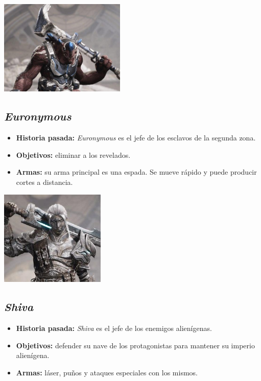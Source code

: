 \documentclass[twoside]{article}
\begin{document}
\begin{center}
\includegraphics[width=6cm]{./images/henkka.jpg}
\end{center}

\subsection{\textit{Euronymous}}
\begin{itemize}
\item \textbf{Historia pasada:} \textit{Euronymous} es el jefe de los esclavos de la segunda zona.
\item \textbf{Objetivos:} eliminar a los revelados.
\item \textbf{Armas:} su arma principal es una espada. Se mueve rápido y puede producir cortes a distancia. 
\end{itemize}

\begin{center}
\includegraphics[width=5cm]{./images/euronymous.jpg}
\end{center}

\subsection{\textit{Shiva}}
\begin{itemize}
\item \textbf{Historia pasada:} \textit{Shiva} es el jefe de los enemigos alienígenas.
\item \textbf{Objetivos:} defender su nave de los protagonistas para mantener su imperio alienígena.
\item \textbf{Armas:} láser, puños y ataques especiales con los mismos. 
\end{itemize}
\end{document}
